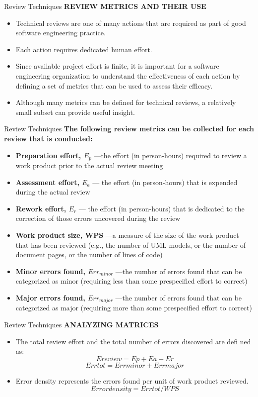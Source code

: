 \documentclass{beamer}
\begin{document}
\begin{frame}{Review Techniques}
		\textbf{REVIEW METRICS AND THEIR USE}
	\begin{itemize}
		\item Technical reviews are one of many actions that are required as part of good software engineering practice. 
		\item Each action requires dedicated human effort. 
		\item Since available project effort is finite, it is important for a software engineering organization   to understand the effectiveness of each action by defining a set of metrics that can be used to assess their efficacy.
		\item Although many metrics can be defined for technical reviews, a relatively small subset can provide useful insight. 
		
		
	\end{itemize}
\end{frame}
\begin{frame}{Review Techniques}
	\textbf{The following review metrics can be collected for each review that is conducted:
	}
	\begin{itemize}
		\item \textbf{Preparation effort, $E_p$} —the effort (in person-hours) required to review a work product prior to  the actual review meeting
		\item \textbf{Assessment effort, $E_a$} — the effort (in person-hours) that is expended during the actual review
		\item \textbf{Rework effort, $E_r$ }— the effort (in person-hours) that is dedicated to the correction of those errors uncovered during the review
		\item \textbf{Work product size, WPS} —a measure of the size of the work product that has been reviewed (e.g., the number of UML models, or the number of document pages, or the number of lines of code)
	\item \textbf{Minor errors found, $Err_{minor}$} —the number of errors found that can be categorized as minor (requiring less than some prespecified effort to correct)
		\item \textbf{Major errors found, $Err_{major}$} —the number of errors found that can be categorized as major (requiring more than some prespecified effort to correct)
		
	\end{itemize}
\end{frame}
\begin{frame}{Review Techniques}
	\textbf{ANALYZING MATRICES}
	\begin{itemize}
	
		\item The total review effort and the total number of errors discovered are defi ned as:
		$$Ereview = Ep + Ea + Er$$ $$ Errtot = Errminor + Errmajor$$
		\item Error density represents the errors found per unit of work product reviewed.
		$$Error density = Errtot/ WPS$$
	\end{itemize}
\end{frame}
\end{document}
